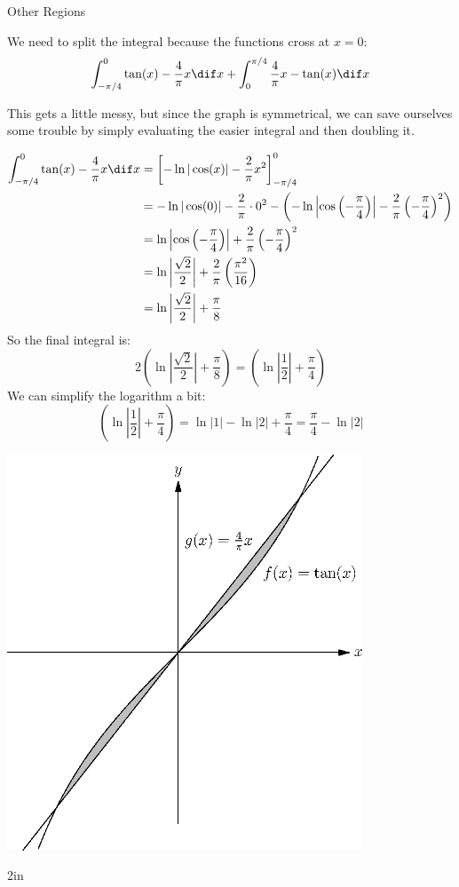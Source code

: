 \begin{exercise}{Other Regions \Coffeecup \Coffeecup}
\begin{itemize}
{We need to split the integral because the functions cross at $x=0$:
$$\int_{-\pi/4}^0\tan(x)-\frac{4}{\pi}x\dif  x+\int_0^{\pi/4}\frac{4}{\pi}x-\tan(x) \dif x
$$

This gets a little messy, but since the graph is symmetrical, we can save ourselves some trouble by simply evaluating the easier integral and then doubling it.

\begin{align*}
\int_{-\pi/4}^0\tan(x)-\frac{4}{\pi}x\dif x&=\left[-\ln|\cos(x)|-\frac{2}{\pi}x^2\right]_{-\pi/4}^0\\
&=-\ln|\cos(0)|-\frac{2}{\pi}\cdot0^2-\left(-\ln\left|\cos\left(-\frac{\pi}{4}\right)\right|-\frac{2}{\pi}\left(-\frac{\pi}{4}\right)^2\right)\\
&=\ln\left|\cos\left(-\frac{\pi}{4}\right)\right|+\frac{2}{\pi}\left(-\frac{\pi}{4}\right)^2\\
&=\ln\left|\frac{\sqrt{2}}{2}\right|+\frac{2}{\pi}\left(\frac{\pi^2}{16}\right)\\
&=\ln\left|\frac{\sqrt{2}}{2}\right|+\frac{\pi}{8}
\end{align*}
So the final integral is:
$$2\left(\ln\left|\frac{\sqrt{2}}{2}\right|+\frac{\pi}{8}\right)=\left(\ln\left|\frac{1}{2}\right|+\frac{\pi}{4}\right)$$
We can simplify the logarithm a bit:
$$\left(\ln\left|\frac{1}{2}\right|+\frac{\pi}{4}\right)=\ln|1|-\ln|2|+\frac{\pi}{4}=\frac{\pi}{4}-\ln|2|$$
\begin{center}
\includegraphics[width=300pt]{ChapterGeom/Figures/tangentarea.eps}
\end{center}
}{2in}

\end{itemize}
\end{exercise}
